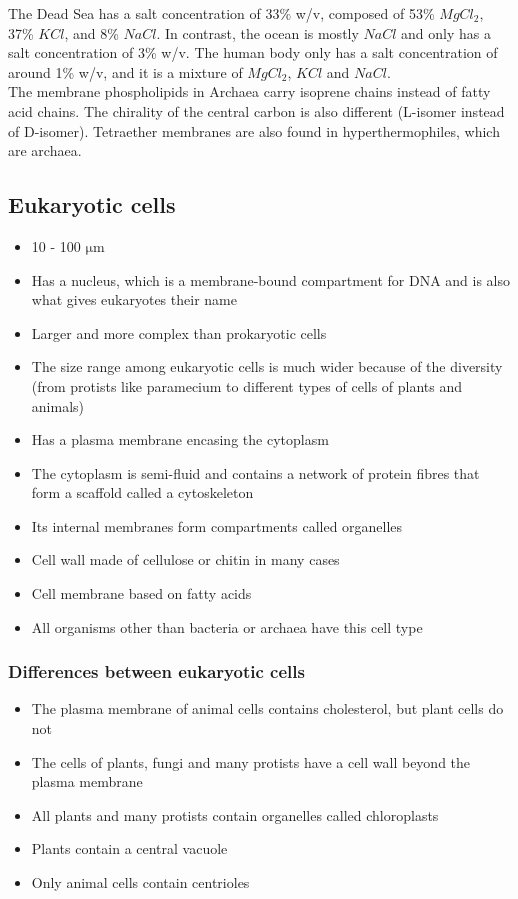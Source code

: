\documentclass[11pt]{article}
\begin{document}
The Dead Sea has a salt concentration of 33\% w/v, composed of 53\% \(MgCl_2\), 37\% \(KCl\), and 8\% \(NaCl\). In contrast, the ocean is mostly \(NaCl\) and only has a salt concentration of 3\% w/v. The human body only has a salt concentration of around 1\% w/v, and it is a mixture of \(MgCl_2\), \(KCl\) and \(NaCl\).
\\[0pt]

The membrane phospholipids in Archaea carry isoprene chains instead of fatty acid chains. The chirality of the central carbon is also different (L-isomer instead of D-isomer). Tetraether membranes are also found in hyperthermophiles, which are archaea.

\newpage

\subsection{Eukaryotic cells}
\label{sec:org9c9a549}
\begin{itemize}
\item 10 - 100 \(\unit{\micro\metre}\)
\item Has a nucleus, which is a membrane-bound compartment for DNA and is also what gives eukaryotes their name
\item Larger and more complex than prokaryotic cells
\item The size range among eukaryotic cells is much wider because of the diversity (from protists like paramecium to different types of cells of plants and animals)
\item Has a plasma membrane encasing the cytoplasm
\item The cytoplasm is semi-fluid and contains a network of protein fibres that form a scaffold called a cytoskeleton
\item Its internal membranes form compartments called organelles
\item Cell wall made of cellulose or chitin in many cases
\item Cell membrane based on fatty acids
\item All organisms other than bacteria or archaea have this cell type
\end{itemize}

\subsubsection{Differences between eukaryotic cells}
\label{sec:org1149c49}
\begin{itemize}
\item The plasma membrane of animal cells contains cholesterol, but plant cells do not
\item The cells of plants, fungi and many protists have a cell wall beyond the plasma membrane
\item All plants and many protists contain organelles called chloroplasts
\item Plants contain a central vacuole
\item Only animal cells contain centrioles
\end{itemize}
\end{document}
